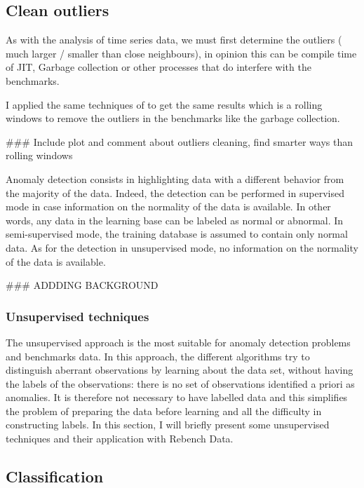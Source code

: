 \documentclass{article}
\begin{document}
\subsection{Clean outliers}


As with the analysis of time series data, we must first determine the outliers ( much larger / smaller than close neighbours), in opinion \cite{barrett2017virtual} this can be compile time of JIT, Garbage collection or other processes that do interfere with the benchmarks.

I applied the same techniques of \cite{barrett2017virtual} to get the same results which is a rolling windows to remove the outliers in the benchmarks like the garbage collection.

\#\#\# Include plot and comment about outliers cleaning, find smarter ways than rolling windows

Anomaly detection consists in highlighting data with a different behavior from the majority of the data. 
Indeed, the detection can be performed in supervised mode in case information on the normality of the data is available. In other words, any data in the learning base can be labeled as normal or abnormal. In semi-supervised mode, the training database is assumed to contain only normal data. 
As for the detection in unsupervised mode, no information on the normality of the data is available. 



\#\#\# ADDDING BACKGROUND

\subsubsection{Unsupervised techniques}
The unsupervised approach is the most suitable for anomaly detection problems and benchmarks data. In this approach, the different algorithms try to distinguish aberrant observations by learning about the data set, without having the labels of the observations: there is no set of observations identified a priori as anomalies. It is therefore not necessary to have labelled data and this simplifies the problem of preparing the data before learning and all the difficulty in constructing labels. In this section, I will briefly present some unsupervised techniques and their application with Rebench Data.




\subsection{Classification}
\end{document}
